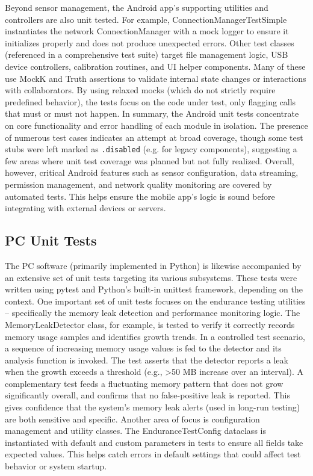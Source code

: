\documentclass[11pt,a4paper]{report}
\begin{document}
Beyond sensor management, the Android app's supporting utilities and controllers are also unit tested. For example, ConnectionManagerTestSimple instantiates the network ConnectionManager with a mock logger to ensure it initializes properly and does not produce unexpected errors. Other test classes (referenced in a comprehensive test suite) target file management logic, USB device controllers, calibration routines, and UI helper components. Many of these use MockK and Truth assertions to validate internal state changes or interactions with collaborators. By using relaxed mocks (which do not strictly require predefined behavior), the tests focus on the code under test, only flagging calls that must or must not happen. In summary, the Android unit tests concentrate on core functionality and error handling of each module in isolation. The presence of numerous test cases indicates an attempt at broad coverage, though some test stubs were left marked as \texttt{.disabled} (e.g. for legacy components), suggesting a few areas where unit test coverage was planned but not fully realized. Overall, however, critical Android features such as sensor configuration, data streaming, permission management, and network quality monitoring are covered by automated tests. This helps ensure the mobile app's logic is sound before integrating with external devices or servers.

\subsection{PC Unit Tests}

The PC software (primarily implemented in Python) is likewise accompanied by an extensive set of unit tests targeting its various subsystems. These tests were written using pytest and Python's built-in unittest framework, depending on the context. One important set of unit tests focuses on the endurance testing utilities – specifically the memory leak detection and performance monitoring logic. The MemoryLeakDetector class, for example, is tested to verify it correctly records memory usage samples and identifies growth trends. In a controlled test scenario, a sequence of increasing memory usage values is fed to the detector and its analysis function is invoked. The test asserts that the detector reports a leak when the growth exceeds a threshold (e.g., >50 MB increase over an interval). A complementary test feeds a fluctuating memory pattern that does not grow significantly overall, and confirms that no false-positive leak is reported. This gives confidence that the system's memory leak alerts (used in long-run testing) are both sensitive and specific. Another area of focus is configuration management and utility classes. The EnduranceTestConfig dataclass is instantiated with default and custom parameters in tests to ensure all fields take expected values. This helps catch errors in default settings that could affect test behavior or system startup.
\end{document}
